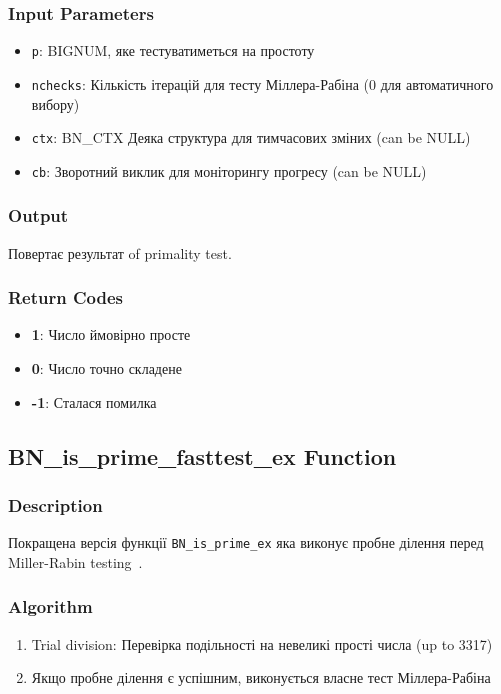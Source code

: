 \subsubsection{Input Parameters}
\begin{itemize}
    \item \texttt{p}: BIGNUM, яке тестуватиметься на простоту
    \item \texttt{nchecks}: Кількість ітерацій для тесту Міллера-Рабіна (0 для автоматичного вибору)
    \item \texttt{ctx}: BN\_CTX Деяка структура для тимчасових зміних (can be NULL)
    \item \texttt{cb}: Зворотний виклик для моніторингу прогресу (can be NULL)
\end{itemize}

\subsubsection{Output}
Повертає результат of primality test.

\subsubsection{Return Codes}
\begin{itemize}
    \item \textbf{1}: Число ймовірно просте
    \item \textbf{0}: Число точно складене
    \item \textbf{-1}: Сталася помилка
\end{itemize}

\subsection{BN\_is\_prime\_fasttest\_ex Function}

\subsubsection{Description}
Покращена версія функції \texttt{BN\_is\_prime\_ex} яка виконує пробне ділення перед Miller-Rabin testing~\cite{crandall2005prime}.

\subsubsection{Algorithm}
\begin{enumerate}
    \item Trial division: Перевірка подільності на невеликі прості числа (up to 3317)
    \item Якщо пробне ділення є успішним, виконується власне тест Міллера-Рабіна
\end{enumerate}

